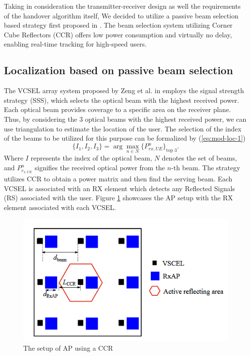 Taking in consideration the transmitter-receiver design as well the requirements of the handover algorithm itself, We decided to utilize a passive beam selection based strategy first proposed in \cite{zeng_vcsel_2022}. The beam selection system utilizing Corner Cube Reflectors (CCR) offers low power consumption and virtually no delay, enabling real-time tracking for high-speed users.
\subsection{Localization based on passive beam selection}
\label{subsec:mod-loc-pas-beam}
The VCSEL array system proposed by Zeng et al. in \cite{zeng_vcsel_2022} employs the signal strength strategy (SSS), which selects the optical beam with the highest received power. Each optical beam provides coverage to a specific area on the receiver plane. Thus, by considering the 3 optical beams with the highest received power, we can use triangulation to estimate the location of the user. The selection of the index of the beams to be utilized for this purpose can be formalized by (\ref{eq:mod-loc-1})
\begin{equation}
    \{I_1, I_2, I_3\} = \arg \max_{n \in N} \{{P_{rx,UE}^n}\}_{\text{top 3}}.
    \label{eq:mod-loc-1}
\end{equation}
Where \(I\) represents the index of the optical beam, \(N\) denotes the set of beams, and \(P_{r_{x,UE}}^n\) signifies the received optical power from the \(n\)-th beam. The strategy utilizes CCR to obtain a power matrix and then find the serving beam. Each VCSEL is associated with an RX element which detects any Reflected Signals (RS) associated with the user. Figure \ref{fig:mod-loc-ap} showcases the AP setup with the RX element associated with each VCSEL.
\begin{figure}
    \centering
    \includegraphics[width=0.75\linewidth]{Figures/modeling-localization-ap-design.png}
    \caption{The setup of AP using a CCR\cite{zeng_vcsel_2022}}
    \label{fig:mod-loc-ap}
\end{figure}

